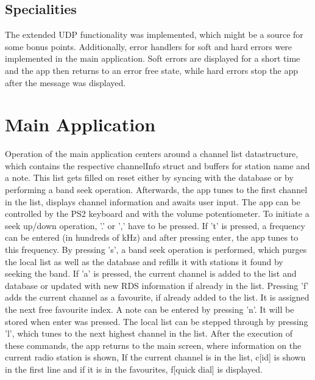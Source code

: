 \documentclass[12pt,a4paper,titlepage,oneside]{article}
\begin{document}
\subsection{Specialities}

The extended UDP functionality was implemented, which might be a source for
some bonus points.
Additionally, error handlers for soft and hard
errors were implemented in the main application. Soft errors are displayed
for a short time and the app then returns to an error free state, while hard
errors stop the app after the message was displayed.

\section{Main Application}

Operation of the main application centers around a channel list datastructure,
which contains the respective channelInfo struct and buffers for station name
and a note. This list gets filled on reset either by syncing with the database
or by performing a band seek operation. Afterwards, the app tunes to the first
channel in the list, displays channel information and awaits user input. The app can be controlled by the 
PS2 keyboard and with the volume potentiometer. To initiate a seek up/down
operation, '.' or ',' have to be pressed. If 't' is pressed, a frequency can be
entered (in hundreds of kHz) and after pressing enter, the app tunes to this
frequency. By pressing 's', a band seek operation is performed, which purges
the local list as well as the database and refills it with stations it found 
by seeking the band. If 'a' is pressed, the current channel is added to the list and
database or updated with new RDS information if already in the list. Pressing
'f' adds the current channel as a favourite, if already added to the list.
It is assigned the next free favourite index. A note can be entered by pressing 'n'.
It will be stored when enter was pressed. The local list can be stepped through
by pressing 'l', which tunes to the next highest channel in the list. After the 
execution of these commands, the app returns to the main screen, where information
on the current radio station is shown, If the current channel is in the list, 
c[id] is shown in the first line and if it is in the favourites, f[quick dial]
is displayed.
\end{document}
